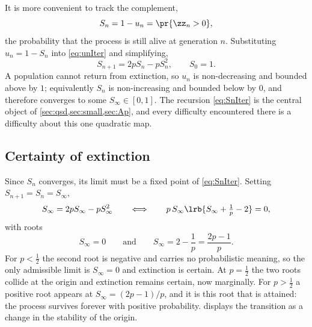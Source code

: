 It is more convenient to track the complement,
\begin{equation*}
S_n = 1-u_n = \pr{\zz_n>0},
\end{equation*}
the probability that the process is still alive at generation $n$. Substituting
$u_n = 1-S_n$ into \cref{eq:unIter} and simplifying,
\begin{equation}
\label{eq:SnIter}
S_{n+1} = 2pS_n - pS_n^2,\qquad S_0=1 .
\end{equation}
A population cannot return from extinction, so $u_n$ is non-decreasing and bounded above
by $1$; equivalently $S_n$ is non-increasing and bounded below by $0$, and therefore
converges to some $S_\infty\in[0,1]$. The recursion \cref{eq:SnIter} is the central
object of \cref{sec:qsd,sec:small,sec:Ap}, and every difficulty encountered there is a
difficulty about this one quadratic map.

\subsection{Certainty of extinction}
\label{sec:certainty}

Since $S_n$ converges, its limit must be a fixed point of \cref{eq:SnIter}. Setting
$S_{n+1}=S_n=S_\infty$,
\begin{equation*}
S_\infty = 2pS_\infty - pS_\infty^2
\qquad\Longleftrightarrow\qquad
p\,S_\infty\lrb{S_\infty + \tfrac1p - 2} = 0,
\end{equation*}
with roots
\begin{equation*}
S_\infty = 0
\qquad\text{and}\qquad
S_\infty = 2-\frac1p = \frac{2p-1}{p}.
\end{equation*}
For $p<\tfrac12$ the second root is negative and carries no probabilistic meaning, so
the only admissible limit is $S_\infty=0$ and extinction is certain. At $p=\tfrac12$ the
two roots collide at the origin and extinction remains certain, now marginally. For
$p>\tfrac12$ a positive root appears at $S_\infty=(2p-1)/p$, and it is this root that is
attained: the process survives forever with positive probability. 
displays the transition as a change in the stability of the origin.

